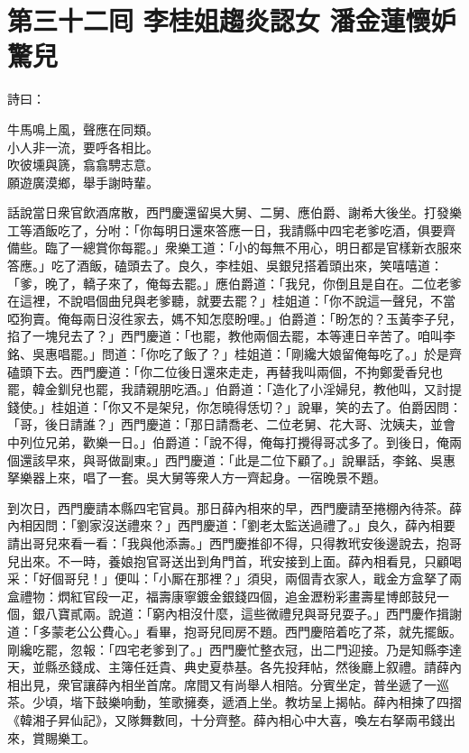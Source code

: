 
\chapter*{第三十二囘 李桂姐趨炎認女 潘金蓮懷妒驚兒}


詩曰：

\begin{myquote}
牛馬鳴上風，聲應在同類。\\小人非一流，要呼各相比。\\吹彼壎與篪，翕翕騁志意。\\願遊廣漠鄉，舉手謝時輩。
\end{myquote}

話說當日衆官飲酒席散，西門慶還留吳大舅、二舅、應伯爵、謝希大後坐。打發樂工等酒飯吃了，分咐：「你每明日還來答應一日，我請縣中四宅老爹吃酒，俱要齊備些。臨了一總賞你每罷。」衆樂工道：「小的每無不用心，明日都是官樣新衣服來答應。」吃了酒飯，磕頭去了。良久，李桂姐、吳銀兒搭着頭出來，笑嘻嘻道：「爹，晚了，轎子來了，俺每去罷。」應伯爵道：「我兒，你倒且是自在。二位老爹在這裡，不說唱個曲兒與老爹聽，就要去罷？」桂姐道：「你不說這一聲兒，不當啞狗賣。俺每兩日沒徃家去，媽不知怎麼盼哩。」伯爵道：「盼怎的？玉黃李子兒，掐了一塊兒去了？」西門慶道：「也罷，教他兩個去罷，本等連日辛苦了。咱叫李銘、吳惠唱罷。」問道：「你吃了飯了？」桂姐道：「剛纔大娘留俺每吃了。」於是齊磕頭下去。西門慶道：「你二位後日還來走走，再替我叫兩個，不拘鄭愛香兒也罷，韓金釧兒也罷，我請親朋吃酒。」伯爵道：「造化了小淫婦兒，教他叫，又討提錢使。」桂姐道：「你又不是架兒，你怎曉得恁切？」說畢，笑的去了。伯爵因問：「哥，後日請誰？」西門慶道：「那日請喬老、二位老舅、花大哥、沈姨夫，並會中列位兄弟，歡樂一日。」伯爵道：「說不得，俺每打攪得哥忒多了。到後日，俺兩個還該早來，與哥做副東。」{}西門慶道：「此是二位下顧了。」說畢話，李銘、吳惠拏樂器上來，唱了一套。吳大舅等衆人方一齊起身。一宿晚景不題。

到次日，西門慶請本縣四宅官員。那日薛內相來的早，西門慶請至捲棚內待茶。薛內相因問：「劉家沒送禮來？」西門慶道：「劉老太監送過禮了。」良久，薛內相要請出哥兒來看一看：「我與他添壽。」西門慶推卻不得，只得教玳安後邊說去，抱哥兒出來。不一時，養娘抱官哥送出到角門首，玳安接到上面。薛內相看見，只顧喝采：「好個哥兒！」便叫：「小厮在那裡？」須臾，兩個青衣家人，戢金方盒拏了兩盒禮物：熌紅官段一疋，福壽康寧鍍金銀錢四個，追金瀝粉彩畫壽星博郎鼓兒一個，銀八寶貳兩。說道：「窮內相沒什麼，這些微禮兒與哥兒耍子。」西門慶作揖謝道：「多蒙老公公費心。」看畢，抱哥兒囘房不題。西門慶陪着吃了茶，就先擺飯。剛纔吃罷，忽報：「四宅老爹到了。」西門慶忙整衣冠，出二門迎接。乃是知縣李達天，並縣丞錢成、主簿任廷貴、典史夏恭基。各先投拜帖，然後廳上叙禮。請薛內相出見，衆官讓薛內相坐首席。席間又有尚舉人相陪。分賓坐定，普坐遞了一巡茶。少頃，堦下鼓樂响動，笙歌擁奏，遞酒上坐。教坊呈上揭帖。薛內相揀了四摺《韓湘子昇仙記》，又隊舞數囘，十分齊整。薛內相心中大喜，喚左右拏兩弔錢出來，賞賜樂工。

